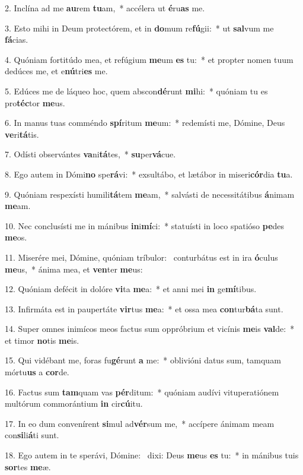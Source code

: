 2. Inclína ad me \textbf{au}rem \textbf{tu}am,~*  accélera ut \textbf{é}ru\textbf{as} me.\

3. Esto mihi in Deum protectórem, et in \textbf{do}mum re\textbf{fú}gii:~*  ut \textbf{sal}vum me \textbf{fá}cias.\

4. Quóniam fortitúdo mea, et refúgium \textbf{me}um \textbf{es} tu:~*  et propter nomen tuum dedúces me, et e\textbf{nú}tri\textbf{es} me.\

5. Edúces me de láqueo hoc, quem abscon\textbf{dé}runt \textbf{mi}hi:~*  quóniam tu es pro\textbf{téc}tor \textbf{me}us.\

6. In manus tuas comméndo \textbf{spí}ritum \textbf{me}um:~*  redemísti me, Dómine, Deus \textbf{ve}ri\textbf{tá}tis.\

7. Odísti observántes \textbf{va}ni\textbf{tá}tes,~*  \textbf{su}per\textbf{vá}cue.\

8. Ego autem in Dómi\textbf{no} spe\textbf{rá}vi:~*  exsultábo, et lætábor in miseri\textbf{cór}dia \textbf{tu}a.\

9. Quóniam respexísti humili\textbf{tá}tem \textbf{me}am,~*  salvásti de necessitátibus \textbf{á}nimam \textbf{me}am.\

10. Nec conclusísti me in mánibus \textbf{in}i\textbf{mí}ci:~*  statuísti in loco spatióso \textbf{pe}des \textbf{me}os.\

11. Miserére mei, Dómine, quóniam tríbulor: \dag\  conturbátus est in ira \textbf{ó}culus \textbf{me}us,~*  ánima mea, et \textbf{ven}ter \textbf{me}us:\

12. Quóniam defécit in dolóre \textbf{vi}ta \textbf{me}a:~*  et anni mei \textbf{in} ge\textbf{mí}tibus.\

13. Infirmáta est in paupertáte \textbf{vir}tus \textbf{me}a:~*  et ossa mea \textbf{con}tur\textbf{bá}ta sunt.\

14. Super omnes inimícos meos factus sum oppróbrium et vicínis \textbf{me}is \textbf{val}de:~*  et timor \textbf{no}tis \textbf{me}is.\

15. Qui vidébant me, foras fu\textbf{gé}runt \textbf{a} me:~*  oblivióni datus sum, tamquam mórtu\textbf{us} a \textbf{cor}de.\

16. Factus sum \textbf{tam}quam vas \textbf{pér}ditum:~*  quóniam audívi vituperatiónem multórum commorántium \textbf{in} cir\textbf{cú}itu.\

17. In eo dum convenírent \textbf{si}mul ad\textbf{vér}sum me,~*  accípere ánimam meam con\textbf{si}li\textbf{á}ti sunt.\

18. Ego autem in te sperávi, Dómine: \dag\  dixi: Deus \textbf{me}us \textbf{es} tu:~*  in mánibus tuis \textbf{sor}tes \textbf{me}æ.\


